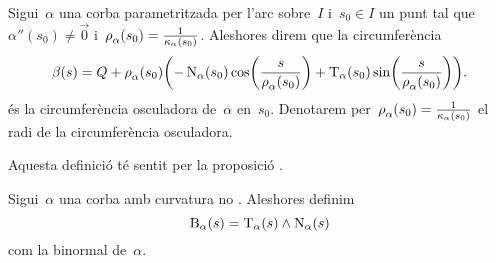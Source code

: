 \documentclass[../../main.tex]{subfiles}
\begin{document}
    \begin{definition}
        \label{def:circumferència osculadora}
        Sigui~\(\alpha\) una corba parametritzada per l'arc sobre~\(I\) i~\(s_{0}\in I\) un punt tal que~\(\alpha''(s_{0})\neq\vec{0}\) i~\(\operatorname{\rho}_{\alpha}(s_{0})=\frac{1}{\operatorname{\kappa}_{\alpha}(s_{0})}\).
        Aleshores direm que la circumferència
        \[
            \beta(s)=Q+\radicircosculadora_{\alpha}(s_{0})\left(-\normal_{\alpha}(s_{0})\cos\left(\frac{s}{\radicircosculadora_{\alpha}(s_{0})}\right)+\tangent_{\alpha}(s_{0})\sin\left(\frac{s}{\radicircosculadora_{\alpha}(s_{0})}\right)\right).
        \]
        és la circumferència osculadora de~\(\alpha\) en~\(s_{0}\).
        Denotarem per~\(\operatorname{\rho}_{\alpha}(s_{0})=\frac{1}{\operatorname{\kappa}_{\alpha}(s_{0})}\) el radi de la circumferència osculadora.

        Aquesta definició té sentit per la proposició .
    \end{definition}
    \begin{definition}[Binormal]
        \label{def:binormal}
        Sigui~\(\alpha\) una corba amb curvatura no \nulla{}.
        Aleshores definim
        \[
            \operatorname{B}_{\alpha}(s)=\operatorname{T}_{\alpha}(s)\mathbin{\wedge}\operatorname{N}_{\alpha}(s)
        \]
        com la binormal de~\(\alpha\).
    \end{definition}
\end{document}
